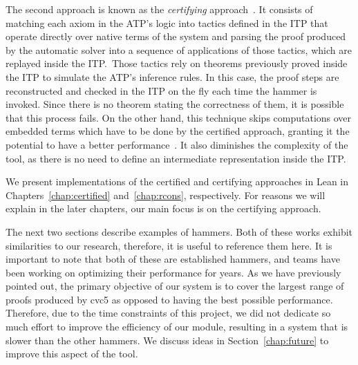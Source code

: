 The second approach is known as the \textit{certifying} approach~\cite{snipe}. It consists of matching
each axiom in the ATP's logic into tactics
defined in the ITP that operate directly over native terms of the system and parsing
the proof produced by the automatic solver into a sequence of applications
of those tactics, which are replayed inside the ITP.\
Those tactics rely on theorems previously proved inside the ITP to simulate the ATP's inference rules.
In this case, the proof steps are reconstructed and checked in the ITP on the
fly each time the hammer is invoked. Since there is no theorem stating the
correctness of them, it is possible that this process fails.
On the other hand,
this technique skips computations over embedded terms which have to be done by the
certified approach, granting it the potential to have a better
performance~\cite{ringLean}. It also diminishes the complexity of the tool, as there is no need to
define an intermediate representation inside the ITP.\

We present implementations of the certified and certifying approaches in Lean
in Chapters~\ref{chap:certified} and~\ref{chap:rcons}, respectively. For reasons
we will explain in the later chapters, our main focus is on the certifying approach.

The next two sections describe examples of hammers.
Both of these works exhibit similarities to our research, therefore, it is useful to reference them here.
It is important to note that both of these are established hammers, and teams have been working on optimizing their
performance for years. As we have previously pointed out, the primary objective of our system is to cover the largest
range of proofs produced by cvc5 as opposed to having the best possible performance.
Therefore, due to the time constraints of this project, we did not dedicate so much effort to improve the
efficiency of our module, resulting in a system that is slower than the other hammers. We discuss ideas in
Section~\ref{chap:future} to improve this aspect of the tool.
